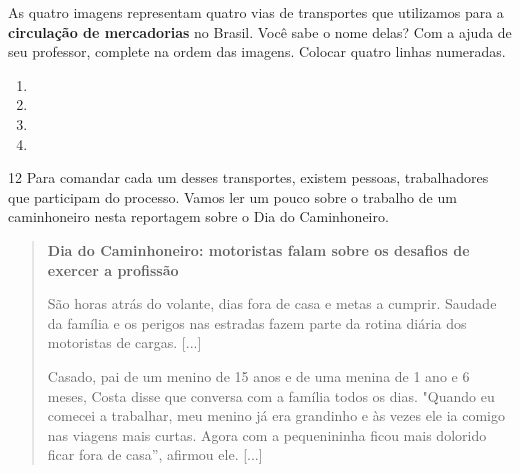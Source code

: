 \begin{itemize}
\begin{itemize}
\begin{itemize}
\begin{itemize}
{{\begin{itemize}
\begin{itemize}




As quatro imagens representam quatro vias de transportes que utilizamos
para a \textbf{circulação de mercadorias} no Brasil. Você sabe o nome
delas? Com a ajuda de seu professor, complete na ordem das imagens.
Colocar quatro linhas numeradas.

\begin{enumerate}
\item \preencher {}

\item \preencher {}

\item \preencher {}

\item \preencher {}

\end{enumerate}

\num{12} Para comandar cada um desses transportes, existem pessoas, trabalhadores que participam do processo. Vamos ler um
pouco sobre o trabalho de um caminhoneiro nesta reportagem sobre o Dia
do Caminhoneiro.

\begin{quote}
\textbf{Dia do Caminhoneiro: motoristas falam sobre os desafios de
exercer a profissão}

São horas atrás do volante, dias fora de casa e metas a cumprir. Saudade
da família e os perigos nas estradas fazem parte da rotina diária dos
motoristas de cargas. [...]

Casado, pai de um menino de 15 anos e de uma menina de 1 ano e 6 meses,
Costa disse que conversa com a família todos os dias. "Quando eu comecei
a trabalhar, meu menino já era grandinho e às vezes ele ia comigo nas
viagens mais curtas. Agora com a pequenininha ficou mais dolorido ficar
fora de casa'', afirmou ele. [...]


\end{quote}
\end{itemize}
\end{itemize}}}
\end{itemize}
\end{itemize}
\end{itemize}
\end{itemize}

